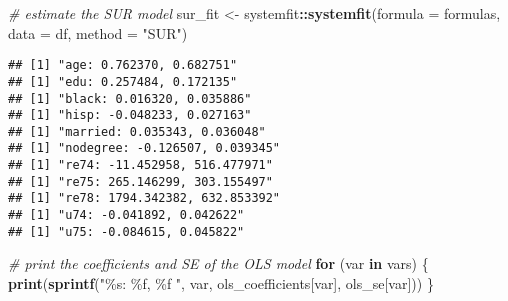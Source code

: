 \documentclass[
]{article}
\newenvironment{Shaded}{\begin{snugshade}}{\end{snugshade}}
\newcommand{\AttributeTok}[1]{\textcolor[rgb]{0.13,0.29,0.53}{#1}}
\newcommand{\CommentTok}[1]{\textcolor[rgb]{0.56,0.35,0.01}{\textit{#1}}}
\newcommand{\ControlFlowTok}[1]{\textcolor[rgb]{0.13,0.29,0.53}{\textbf{#1}}}
\newcommand{\DecValTok}[1]{\textcolor[rgb]{0.00,0.00,0.81}{#1}}
\newcommand{\FunctionTok}[1]{\textcolor[rgb]{0.13,0.29,0.53}{\textbf{#1}}}
\newcommand{\NormalTok}[1]{#1}
\newcommand{\OtherTok}[1]{\textcolor[rgb]{0.56,0.35,0.01}{#1}}
\newcommand{\SpecialCharTok}[1]{\textcolor[rgb]{0.81,0.36,0.00}{\textbf{#1}}}
\newcommand{\StringTok}[1]{\textcolor[rgb]{0.31,0.60,0.02}{#1}}
\begin{document}
\begin{Shaded}
\begin{Highlighting}[]
\CommentTok{\# estimate the SUR model}
\NormalTok{sur\_fit }\OtherTok{\textless{}{-}}\NormalTok{ systemfit}\SpecialCharTok{::}\FunctionTok{systemfit}\NormalTok{(}\AttributeTok{formula =}\NormalTok{ formulas, }\AttributeTok{data =}\NormalTok{ df, }\AttributeTok{method =} \StringTok{"SUR"}\NormalTok{)}
\end{Highlighting}
\end{Shaded}

\begin{Shaded}
\end{Shaded}

\begin{verbatim}
## [1] "age: 0.762370, 0.682751"
## [1] "edu: 0.257484, 0.172135"
## [1] "black: 0.016320, 0.035886"
## [1] "hisp: -0.048233, 0.027163"
## [1] "married: 0.035343, 0.036048"
## [1] "nodegree: -0.126507, 0.039345"
## [1] "re74: -11.452958, 516.477971"
## [1] "re75: 265.146299, 303.155497"
## [1] "re78: 1794.342382, 632.853392"
## [1] "u74: -0.041892, 0.042622"
## [1] "u75: -0.084615, 0.045822"
\end{verbatim}

\begin{Shaded}
\begin{Highlighting}[]
\CommentTok{\# print the coefficients and SE of the OLS model}
\ControlFlowTok{for}\NormalTok{ (var }\ControlFlowTok{in}\NormalTok{ vars)}
\NormalTok{\{}
  \FunctionTok{print}\NormalTok{(}\FunctionTok{sprintf}\NormalTok{(}\StringTok{"\%s: \%f, \%f "}\NormalTok{, var, ols\_coefficients[var], ols\_se[var]))}
\NormalTok{\}}
\end{Highlighting}
\end{Shaded}
\end{document}
